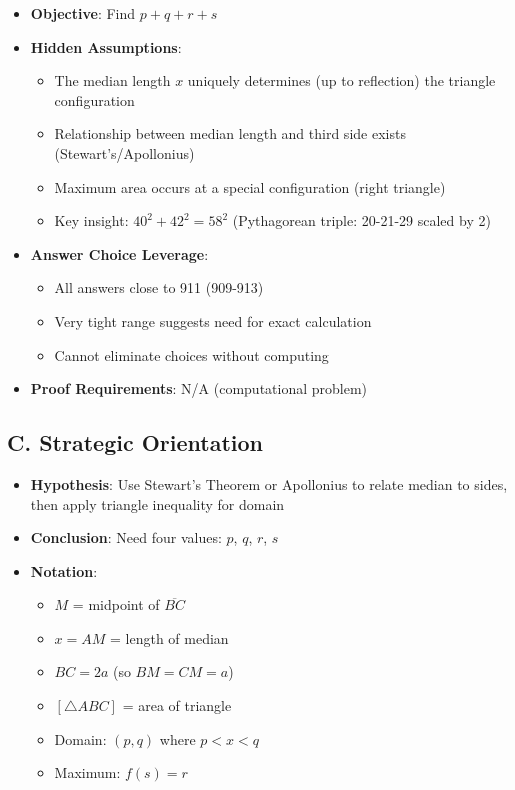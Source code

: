 \documentclass[12pt]{article}
\begin{document}
\begin{problemconfigbox}
\begin{itemize}[leftmargin=*]
    \item \textbf{Objective}: Find $p + q + r + s$
    
    \item \textbf{Hidden Assumptions}: 
    \begin{itemize}
        \item The median length $x$ uniquely determines (up to reflection) the triangle configuration
        \item Relationship between median length and third side exists (Stewart's/Apollonius)
        \item Maximum area occurs at a special configuration (right triangle)
        \item Key insight: $40^2 + 42^2 = 58^2$ (Pythagorean triple: 20-21-29 scaled by 2)
    \end{itemize}
    
    \item \textbf{Answer Choice Leverage}: 
    \begin{itemize}
        \item All answers close to 911 (909-913)
        \item Very tight range suggests need for exact calculation
        \item Cannot eliminate choices without computing
    \end{itemize}
    
    \item \textbf{Proof Requirements}: N/A (computational problem)
\end{itemize}

\subsection*{C. Strategic Orientation}
\begin{itemize}[leftmargin=*]
    \item \textbf{Hypothesis}: Use Stewart's Theorem or Apollonius to relate median to sides, then apply triangle inequality for domain
    
    \item \textbf{Conclusion}: Need four values: $p$, $q$, $r$, $s$
    
    \item \textbf{Notation}: 
    \begin{itemize}
        \item $M$ = midpoint of $\overline{BC}$
        \item $x = AM$ = length of median
        \item $BC = 2a$ (so $BM = CM = a$)
        \item $[\triangle ABC]$ = area of triangle
        \item Domain: $(p, q)$ where $p < x < q$
        \item Maximum: $f(s) = r$
    \end{itemize}
    

\end{itemize}
\end{problemconfigbox}
\end{document}
